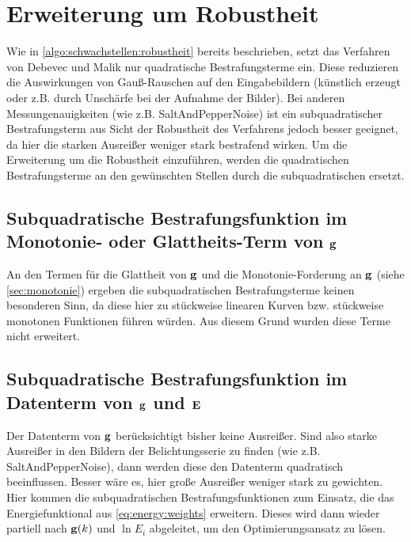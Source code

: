 \section{Erweiterung um Robustheit}
\label{sec:robustheit}

Wie in \autoref{algo:schwachstellen:robustheit} bereits beschrieben, setzt das Verfahren von Debevec und Malik nur quadratische Bestrafungsterme ein. Diese reduzieren die Auswirkungen von Gauß-Rauschen auf den Eingabebildern (künstlich erzeugt oder z.B. durch Unschärfe bei der Aufnahme der Bilder). Bei anderen Messungenauigkeiten (wie z.B. \gls{SaltAndPepperNoise}) ist ein subquadratischer Bestrafungsterm aus Sicht der Robustheit des Verfahrens jedoch besser geeignet, da hier die starken Ausreißer weniger stark bestrafend wirken. Um die Erweiterung um die Robustheit einzuführen, werden die quadratischen Bestrafungsterme an den gewünschten Stellen durch die subquadratischen ersetzt. 


\subsection{Subquadratische Bestrafungsfunktion im Monotonie- oder Glattheits-Term von $\mathbf g$}
An den Termen für die Glattheit von $\mathbf g$ und die Monotonie-Forderung an $\mathbf g$ (siehe \autoref{sec:monotonie}) ergeben die subquadratischen Bestrafungsterme keinen besonderen Sinn, da diese hier zu stückweise linearen Kurven bzw. stückweise monotonen Funktionen führen würden. Aus diesem Grund wurden diese Terme nicht erweitert.


\subsection{Subquadratische Bestrafungsfunktion im Datenterm von $\mathbf g$ und $\mathbf E$}
Der Datenterm von $\mathbf g$ berücksichtigt bisher keine Ausreißer. Sind also starke Ausreißer in den Bildern der Belichtungsserie zu finden (wie z.B. \gls{SaltAndPepperNoise}), dann werden diese den Datenterm quadratisch beeinflussen. Besser wäre es, hier große Ausreißer weniger stark zu gewichten.
Hier kommen die subquadratischen Bestrafungsfunktionen zum Einsatz, die das Energiefunktional aus \autoref{eq:energy:weights} erweitern. Dieses wird dann wieder partiell nach $\mathbf g(k)$ und $\ln E_i$ abgeleitet, um den Optimierungsansatz zu lösen. 

